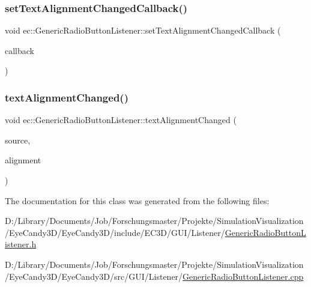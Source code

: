 \mbox{\label{classec_1_1_generic_radio_button_listener_a90c75e6db58773ab30347174e40d33ae}} 
\subsubsection{\texorpdfstring{set\+Text\+Alignment\+Changed\+Callback()}{setTextAlignmentChangedCallback()}}
{\footnotesize\ttfamily void ec\+::\+Generic\+Radio\+Button\+Listener\+::set\+Text\+Alignment\+Changed\+Callback (\begin{DoxyParamCaption}\item[{const \mbox{\hyperlink{classec_1_1_generic_radio_button_listener_a3e8ead6a08363f220625d2f856b9213d}{Text\+Alignment\+Changed\+\_\+\+Callback}} \&}]{callback }\end{DoxyParamCaption})}

\mbox{\label{classec_1_1_generic_radio_button_listener_a324705c5155f71e01104399b12a95b8f}} 
\subsubsection{\texorpdfstring{text\+Alignment\+Changed()}{textAlignmentChanged()}}
{\footnotesize\ttfamily void ec\+::\+Generic\+Radio\+Button\+Listener\+::text\+Alignment\+Changed (\begin{DoxyParamCaption}\item[{agui\+::\+Radio\+Button $\ast$}]{source,  }\item[{agui\+::\+Area\+Alignment\+Enum}]{alignment }\end{DoxyParamCaption})\hspace{0.3cm}{\ttfamily [override]}}



The documentation for this class was generated from the following files\+:\begin{DoxyCompactItemize}
\item 
D\+:/\+Library/\+Documents/\+Job/\+Forschungsmaster/\+Projekte/\+Simulation\+Visualization/\+Eye\+Candy3\+D/\+Eye\+Candy3\+D/include/\+E\+C3\+D/\+G\+U\+I/\+Listener/\mbox{\hyperlink{_generic_radio_button_listener_8h}{Generic\+Radio\+Button\+Listener.\+h}}\item 
D\+:/\+Library/\+Documents/\+Job/\+Forschungsmaster/\+Projekte/\+Simulation\+Visualization/\+Eye\+Candy3\+D/\+Eye\+Candy3\+D/src/\+G\+U\+I/\+Listener/\mbox{\hyperlink{_generic_radio_button_listener_8cpp}{Generic\+Radio\+Button\+Listener.\+cpp}}\end{DoxyCompactItemize}
